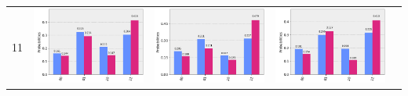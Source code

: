 \documentclass[11pt]{article}
\begin{document}
\begin{table}[h!]
\begin{tabular}{| c | c | c | c | c | }
\begin{minipage}{.215\textwidth}
    \end{minipage}
    \\ \hline
    11 & 
    \begin{minipage}{.215\textwidth}
    \includegraphics[width=\linewidth]{img/rand_qecc3_X11.png}
    \end{minipage}&
    \begin{minipage}{.215\textwidth}
    \includegraphics[width=\linewidth]{img/rand_qecc3_Y11.png}
    \end{minipage}
    &\begin{minipage}{.215\textwidth}
    \includegraphics[width=\linewidth]{img/rand_qecc3_Z11.png}

\end{minipage}
\end{tabular}
\end{table}
\end{document}
